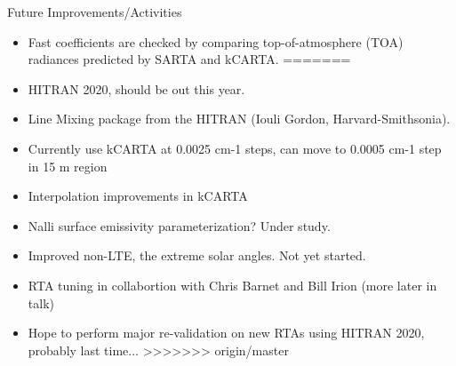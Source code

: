 \documentclass[10pt,t]{beamer}
\begin{document}
\begin{frame}{Future Improvements/Activities}

  \begin{itemize}
<<<<<<< HEAD
  \item Fast coefficients are checked by comparing top-of-atmosphere (TOA) radiances predicted by SARTA and kCARTA.
=======
  \item HITRAN 2020, should be out this year.
  \item Line Mixing package from the HITRAN (Iouli Gordon, Harvard-Smithsonia).
  \item Currently use kCARTA at 0.0025 cm-1 steps, can move to 0.0005 cm-1 step in 15 \um m region
  \item Interpolation improvements in kCARTA
  \item Nalli surface emissivity parameterization?  Under study.
  \item Improved non-LTE, the extreme solar angles.  Not yet started.
  \item RTA tuning in collabortion with Chris Barnet and Bill Irion (more later in talk)
  \item Hope to perform major re-validation on new RTAs using HITRAN 2020, probably last time...
>>>>>>> origin/master
  \end{itemize}
\end{frame}
\end{document}
